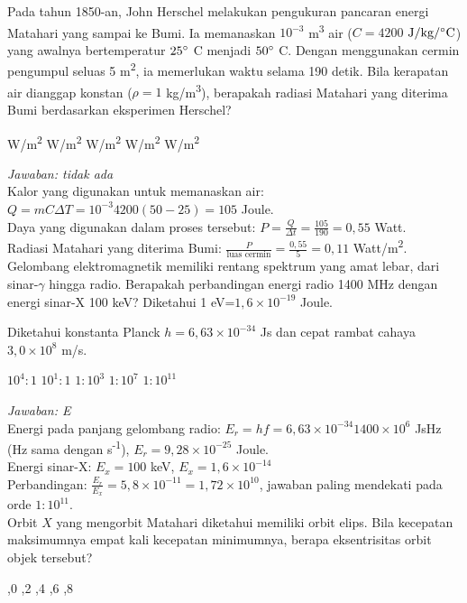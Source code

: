 \documentclass[11pt,fleqn]{exam}
\begin{document}
\begin{questions}
\question Pada tahun 1850-an, John Herschel melakukan pengukuran pancaran energi Matahari yang sampai ke Bumi. Ia memanaskan $10^{-3}$ m\textsuperscript{3} air ($C=4200$ $\text{J}/\text{kg}/\degree \text{C}$) yang awalnya bertemperatur $25\degree$ C menjadi $50\degree$ C. Dengan menggunakan cermin pengumpul seluas 5 m\textsuperscript{2}, ia memerlukan waktu selama 190 detik. Bila kerapatan air dianggap konstan ($\rho=1$ kg/m\textsuperscript{3}), berapakah radiasi Matahari yang diterima Bumi berdasarkan eksperimen Herschel?
\begin{choices}
 W/m\textsuperscript{2}
 W/m\textsuperscript{2}
 W/m\textsuperscript{2}
 W/m\textsuperscript{2}
 W/m\textsuperscript{2}
\end{choices}

\textit{Jawaban: tidak ada}\\
Kalor yang digunakan untuk memanaskan air: $Q=mC\Delta T= 10^{-3} 4200 (50-25) = 105$ Joule.\\
Daya yang digunakan dalam proses tersebut: $P=\frac{Q}{\Delta t}=\frac{105}{190}=0,55$ Watt.\\
Radiasi Matahari yang diterima Bumi: $\frac{P}{\text{luas cermin}}=\frac{0,55}{5}=0,11$ Watt/m\textsuperscript{2}.\\


\question Gelombang elektromagnetik memiliki rentang spektrum yang amat lebar, dari sinar-$\gamma$ hingga radio. Berapakah perbandingan energi radio 1400 MHz dengan energi sinar-X 100 keV? Diketahui 1 eV=$1,6\times 10^{-19}$ Joule.

\noindent Diketahui konstanta Planck $h=6,63\times 10^{-34}$ Js dan cepat rambat cahaya $3,0\times 10^{8}$ m/s.
\begin{choices}
\choice $10^4 : 1$
\choice $10^1 : 1$
\choice $1 : 10^3$
\choice $1 : 10^7$
\choice $1 : 10^{11}$
\end{choices}

\textit{Jawaban: E}\\ 
Energi pada panjang gelombang radio: $E_r=hf=6,63\times 10^{-34}1400\times 10^6$ JsHz (Hz sama dengan s\textsuperscript{-1}), $E_r=9,28\times 10^{-25}$ Joule.\\
Energi sinar-X: $E_x=100$ keV, $E_x=1,6\times 10^{-14}$\\
Perbandingan: $\frac{E_r}{E_x}=5,8\times 10^{-11}=1,72\times 10^{10}$, jawaban paling mendekati pada orde $1:10^{11}$.\\


\question Orbit $X$ yang mengorbit Matahari diketahui memiliki orbit elips. Bila kecepatan maksimumnya empat kali kecepatan minimumnya, berapa eksentrisitas orbit objek tersebut?
\begin{choices}
,0
,2
,4
,6
,8
\end{choices}


\end{questions}
\end{document}
